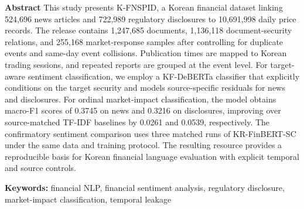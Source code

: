\documentclass[10pt]{article}
\newcommand{\dataset}{K-FNSPID}
\begin{document}
\vspace{5mm}
\noindent\textbf{Abstract}\quad
This study presents \dataset{}, a Korean financial dataset linking 524,696 news articles and 722,989 regulatory disclosures to 10,691,998 daily price records. The release contains 1,247,685 documents, 1,136,118 document-security relations, and 255,168 market-response samples after controlling for duplicate events and same-day event collisions. Publication times are mapped to Korean trading sessions, and repeated reports are grouped at the event level. For target-aware sentiment classification, we employ a KF-DeBERTa classifier that explicitly conditions on the target security and models source-specific residuals for news and disclosures. For ordinal market-impact classification, the model obtains macro-F1 scores of 0.3745 on news and 0.3216 on disclosures, improving over source-matched TF-IDF baselines by 0.0261 and 0.0539, respectively. The confirmatory sentiment comparison uses three matched runs of KR-FinBERT-SC under the same data and training protocol. The resulting resource provides a reproducible basis for Korean financial language evaluation with explicit temporal and source controls.

\vspace{1mm}
\noindent\textbf{Keywords:} financial NLP, financial sentiment analysis, regulatory disclosure, market-impact classification, temporal leakage
\end{document}
